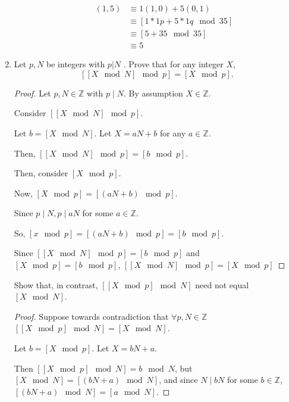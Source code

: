 \documentclass{article}
\begin{document}
\begin{enumerate}
\begin{enumerate}
        \begin{align*}
          (1, 5) &\equiv 1(1, 0) + 5(0, 1)\\
                 &\equiv [1 * 1p + 5 * 1q \mod 35]\\
                 &\equiv [5 + 35 \mod 35]\\
                 &\equiv \boxed{5}
        \end{align*}

    \end{enumerate}
  \item Let $p, N$ be integers with $p | N$ . Prove that for any integer $X$,
    \[
      [[X \mod N ] \mod p ] = [X \mod p ].
    \]

    \begin{proof}
      Let $p, N \in \mathbb{Z}$ with $p \mid N$. By assumption $X \in \mathbb{Z}$.

      Consider $\left[\left[X \mod N\right] \mod p\right]$.

      Let $b = \left[X \mod N\right]$. Let $X = aN + b$ for any $a \in
      \mathbb{Z}$.

      Then, $\left[\left[X \mod N\right] \mod p\right] = \left[b \mod p\right]$.

      Then, consider $\left[X \mod p\right]$.

      Now, $\left[X \mod p\right] = \left[(aN + b) \mod p\right]$.

      Since $p \mid N, p \mid aN$ for some $a \in \mathbb{Z}$.

      So, $\left[x \mod p\right] = \left[(aN + b) \mod p\right] = \left[b \mod
      p\right]$.

      Since $\left[\left[X \mod N\right] \mod p\right] = \left[b \mod p\right]$
      and $\left[X \mod p\right] = \left[b \mod p\right]$, $\left[\left[X \mod
      N\right] \mod p\right] = \left[X \mod p\right]$
    \end{proof}

    Show that, in contrast, $[[X \mod p ] \mod N ]$ need not equal $[X \mod N]$.

    \begin{proof}
      Suppose towards contradiction that $\forall p, N \in \mathbb{Z}$
      $\left[\left[X \mod p\right] \mod N\right] = \left[X \mod N\right]$.

      Let $b = \left[X \mod p\right]$. Let $X = bN + a$.

      Then $\left[\left[X \mod p\right] \mod N\right] = b \mod N$, but $\left[X
      \mod N\right] = \left[(bN + a) \mod N\right]$, and since $N \mid bN$ for
      some $b \in \mathbb{Z}$, $\left[(bN + a) \mod N\right] = \left[a \mod
      N\right]$.


\end{proof}
\end{enumerate}
\end{document}

